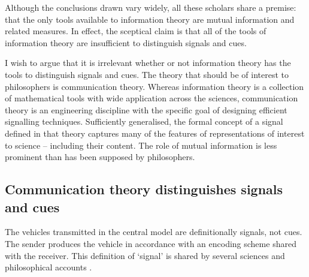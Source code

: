 Although the conclusions drawn vary widely, all these scholars share a premise: that the only tools available to information theory are mutual information and related measures.
In effect, the sceptical claim is that all of the tools of information theory are insufficient to distinguish signals and cues.

I wish to argue that it is irrelevant whether or not information theory has the tools to distinguish signals and cues.
The theory that should be of interest to philosophers is communication theory.
Whereas information theory is a collection of mathematical tools with wide application across the sciences, communication theory is an engineering discipline with the specific goal of designing efficient signalling techniques.
Sufficiently generalised, the formal concept of a signal defined in that theory captures many of the features of representations of interest to science -- including their content.
The role of mutual information is less prominent than has been supposed by philosophers.

\subsection{Communication theory distinguishes signals and cues}

The vehicles transmitted in the central model are definitionally signals, not cues.
The sender produces the vehicle in accordance with an encoding scheme shared with the receiver.
This definition of `signal' is shared by several sciences \citep{shannon1948mathematicala,maynardsmith2003animal} and philosophical accounts \citep[$\S$6]{millikan2004varieties} \citep{bergstrom2011transmission}.

